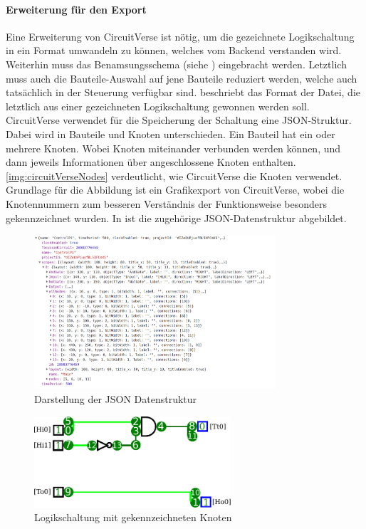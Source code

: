 \paragraph{Erweiterung für den Export}\label{par:erw}
 Eine Erweiterung von CircuitVerse ist nötig, um die gezeichnete Logikschaltung in ein Format umwandeln zu können, welches vom Backend verstanden wird. Weiterhin muss das Benamsungsschema (siehe ) eingebracht werden. Letztlich muss auch die Bauteile-Auswahl auf jene Bauteile reduziert werden, welche auch tatsächlich in der Steuerung verfügbar sind.  beschriebt das Format der Datei, die letztlich aus einer gezeichneten Logikschaltung gewonnen werden soll. CircuitVerse verwendet für die Speicherung der Schaltung eine JSON-Struktur. Dabei wird in Bauteile und Knoten unterschieden. Ein Bauteil hat ein oder mehrere Knoten. Wobei Knoten miteinander verbunden werden können, und dann jeweils Informationen über angeschlossene Knoten enthalten. \autoref{img:circuitVerseNodes} verdeutlicht, wie CircuitVerse die Knoten verwendet. Grundlage für die Abbildung ist ein Grafikexport von CircuitVerse, wobei die Knotennummern zum besseren Verständnis der Funktionsweise besonders gekennzeichnet wurden. In  ist die zugehörige JSON-Datenstruktur abgebildet.
 \begin{figure}[H]
 	\begin{center}
 		\includegraphics[width=0.8\textwidth ,clip]{./images/circuitverseLogicJson.png}
 		\caption{Darstellung der JSON Datenstruktur}
 		\label{img:circuitVerseJson}
 	\end{center} 
 \end{figure}	
 
 \begin{figure}[H]
 	\begin{center}
 		\includegraphics[width=0.65\textwidth ,clip]{./images/circuitverseLogicNodes.pdf}
 		\caption{Logikschaltung mit gekennzeichneten Knoten}
 		\label{img:circuitVerseNodes}
 	\end{center} 
 \end{figure}	
 
